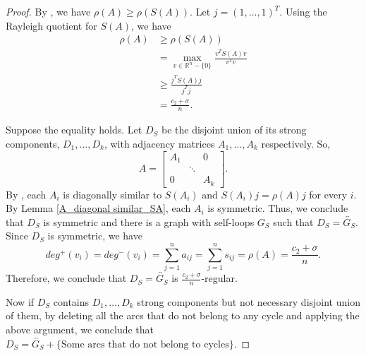 \documentclass[12pt,a4paper,reqno]{amsart}
\numberwithin{equation}{section}
\theoremstyle{plain}
\theoremstyle{definition}
\newcommand{\<}{\langle}
\renewcommand{\>}{\rangle}
\newcommand{\R}{{\mathbb R}}
\begin{document}
    \begin{proof}
        By \cite[Theorem 1]{kolotilina1993perronroot}, we have $\rho(A)\geq \rho(S(A))$. Let $j=(1, \ldots, 1)^T$. Using the Rayleigh quotient for $S(A)$, we have 
        \begin{align*}
            \rho(A) &\geq \rho(S(A))\\
            &=\max_{v\in \R^n-\{0\}} \frac{v^TS(A)v}{v^Tv}\\
            &\geq \frac{j^TS(A)j}{j^Tj}\\
            &=\frac{c_2+\sigma}{n}.
        \end{align*}
        
        Suppose the equality holds. Let $D_S$ be the disjoint union of its strong components, $D_1, \ldots, D_k$, with adjacency matrices $A_1, \ldots, A_k$ respectively. So,
        \begin{equation}
        A=\begin{bmatrix}
        
            A_1 &        &0    \\
               & \ddots                \\
            0    &        & A_k
        \end{bmatrix}.
        \end{equation}
        By \cite[Theorem 2]{kolotilina1993perronroot}, each $A_i$ is diagonally similar to $S(A_i)$ and $S(A_i)j=\rho(A)j$ for every $i$. By Lemma \ref{A_diagonal similar_SA}, each $A_i$ is symmetric. Thus, we conclude that $D_S$ is symmetric and there is a graph with self-loops $G_S$ such that $D_S=\overleftrightarrow{G_S}$.
        Since $D_S$ is symmetric, we have 
        $$deg^+(v_i)=deg^-(v_i)=\sum_{j=1}^n a_{ij}=\sum_{j=1}^n s_{ij}=\rho(A)=\frac{c_2+\sigma}{n}.$$
        Therefore, we conclude that $D_S=\overleftrightarrow{G_S}$ is $\frac{c_2+\sigma}{n}$-regular.

        Now if $D_S$ contains $D_1, \ldots, D_k$ strong components but not necessary disjoint union of them, by deleting all the arcs that do not belong to any cycle and applying the above argument, we conclude that $D_S=\overleftrightarrow{G_S}+ \text{\{Some arcs that do not belong to cycles\}}$.
    \end{proof}
    
\end{document}
